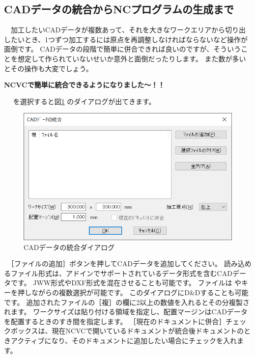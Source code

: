 

\subsection{CADデータの統合からNCプログラムの生成まで}
　加工したいCADデータが複数あって、それを大きなワークエリアから切り出したいとき、1つずつ加工するには原点を再調整しなければならないなど操作が面倒です。
CADデータの段階で簡単に併合できれば良いのですが、そういうことを想定して作られていないせいか意外と面倒だったりします。
また数が多いとその操作も大変でしょう。
\begin{center}
\textbf{NCVCで簡単に統合できるようになりました～！！}
\end{center}
　 を選択すると図\ref{fig:bind.png} のダイアログが出てきます。

\begin{figure}[H]
\centering
\includegraphics[scale=0.7]{No1/fig/bind.png}
\caption{CADデータの統合ダイアログ}
\label{fig:bind.png}
\end{figure}

　［ファイルの追加］ボタンを押してCADデータを追加してください。
読み込めるファイル形式は、アドインでサポートされているデータ形式を含むCADデータです。
JWW形式やDXF形式を混在させることも可能です。
ファイルは やキーを押しながらの複数選択が可能です。
このダイアログにD\&Dすることも可能です。
追加されたファイルの［複］の欄に2以上の数値を入れるとその分複製されます。
ワークサイズは貼り付ける領域を指定し、配置マージンはCADデータを配置するときのすき間を指定します。
［現在のドキュメントに併合］チェックボックスは、現在NCVCで開いているドキュメントが統合後ドキュメントのときアクティブになり、そのドキュメントに追加したい場合にチェックを入れます。

